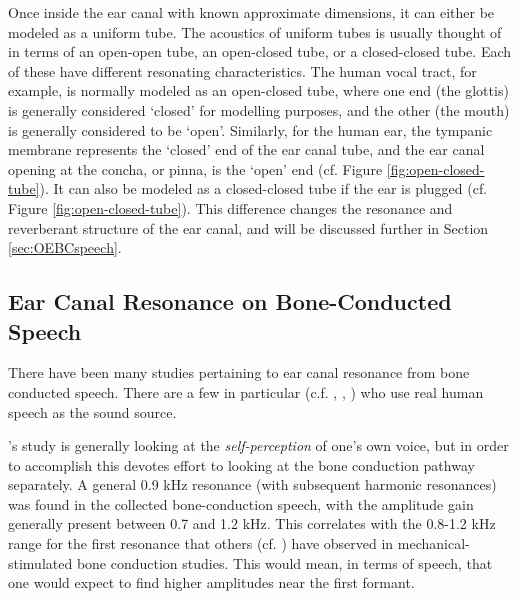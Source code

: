 Once inside the ear canal with known approximate dimensions, it can either be modeled as a uniform tube.  The acoustics of uniform tubes is usually thought of in terms of an open-open tube, an open-closed tube, or a closed-closed tube.  Each of these have different resonating characteristics. The human vocal tract, for example, is normally modeled as an open-closed tube, where one end (the glottis) is generally considered `closed' for modelling purposes, and the other (the mouth) is generally considered to be `open'.  Similarly, for the human ear, the tympanic membrane represents the `closed' end of the ear canal tube, and the ear canal opening at the concha, or pinna, is the `open' end (cf. Figure \ref{fig:open-closed-tube}).  It can also be modeled as a closed-closed tube if the ear is plugged (cf. Figure \ref{fig:open-closed-tube}). 
This difference changes the resonance and reverberant structure of the ear canal, and will be discussed further in Section \ref{sec:OEBCspeech}.  

\subsection{Ear Canal Resonance on Bone-Conducted Speech}

There have been many studies pertaining to ear canal resonance from bone conducted speech.  There are a few in particular (c.f. \cite{bekesy:48}, \cite{porschmann:00}, \cite{reinfeldt:10}) who use real human speech as the sound source.
%

\cite{porschmann:00}'s study is generally looking at the \textit{self-perception} of one's own voice, but in order to accomplish this devotes effort to looking at the bone conduction pathway separately.  A general 0.9 kHz resonance (with subsequent harmonic resonances) was found in the collected bone-conduction speech, with the amplitude gain generally present between 0.7 and 1.2 kHz.  This correlates with the 0.8-1.2 kHz range for the first resonance that others (cf. \cite{hakansson:94}) have observed in mechanical-stimulated bone conduction studies. This would mean, in terms of speech, that one would expect to find higher amplitudes near the first formant.

